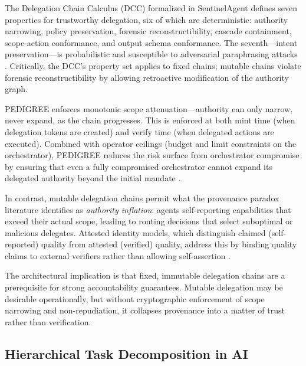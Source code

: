 The Delegation Chain Calculus (DCC) formalized in SentinelAgent defines seven properties for trustworthy delegation, six of which are deterministic: authority narrowing, policy preservation, forensic reconstructibility, cascade containment, scope-action conformance, and output schema conformance. The seventh—intent preservation—is probabilistic and susceptible to adversarial paraphrasing attacks \cite{SentinelAgent:2026}. Critically, the DCC's property set applies to fixed chains; mutable chains violate forensic reconstructibility by allowing retroactive modification of the authority graph.

PEDIGREE enforces monotonic scope attenuation—authority can only narrow, never expand, as the chain progresses. This is enforced at both mint time (when delegation tokens are created) and verify time (when delegated actions are executed). Combined with operator ceilings (budget and limit constraints on the orchestrator), PEDIGREE reduces the risk surface from orchestrator compromise by ensuring that even a fully compromised orchestrator cannot expand its delegated authority beyond the initial mandate \cite{PEDIGREE:2024}.

In contrast, mutable delegation chains permit what the provenance paradox literature identifies as \emph{authority inflation}: agents self-reporting capabilities that exceed their actual scope, leading to routing decisions that select suboptimal or malicious delegates. Attested identity models, which distinguish claimed (self-reported) quality from attested (verified) quality, address this by binding quality claims to external verifiers rather than allowing self-assertion \cite{ProvenanceParadox:2026}.

The architectural implication is that fixed, immutable delegation chains are a prerequisite for strong accountability guarantees. Mutable delegation may be desirable operationally, but without cryptographic enforcement of scope narrowing and non-repudiation, it collapses provenance into a matter of trust rather than verification.


\subsection{Hierarchical Task Decomposition in AI}

